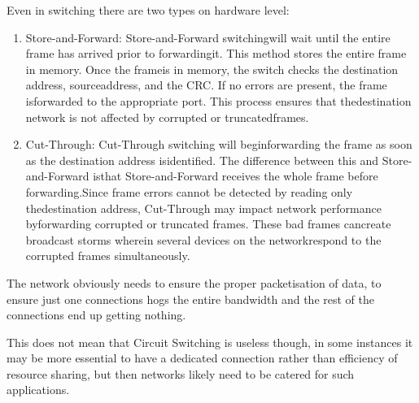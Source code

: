 \documentclass[11pt, a4paper]{article}
\begin{document}
Even in switching there are two types on hardware level:
\begin{enumerate}
    \item Store-and-Forward: Store-and-Forward switchingwill wait until the entire frame has arrived prior to forwardingit. This method stores the entire frame in memory. Once the frameis in memory, the switch checks the destination address, sourceaddress, and the CRC. If no errors are present, the frame isforwarded to the appropriate port. This process ensures that thedestination network is not affected by corrupted or truncatedframes.
    \item Cut-Through: Cut-Through switching will beginforwarding the frame as soon as the destination address isidentified. The difference between this and Store-and-Forward isthat Store-and-Forward receives the whole frame before forwarding.Since frame errors cannot be detected by reading only thedestination address, Cut-Through may impact network performance byforwarding corrupted or truncated frames. These bad frames cancreate broadcast storms wherein several devices on the networkrespond to the corrupted frames simultaneously.
\end{enumerate}

The network obviously needs to ensure the proper packetisation of data, to ensure just one connections hogs the entire bandwidth and the rest of the connections end up getting nothing.

This does not mean that Circuit Switching is useless though, in some instances it may be more essential to have a dedicated connection rather than efficiency of resource sharing, but then networks likely need to be catered for such applications.
\end{document}
